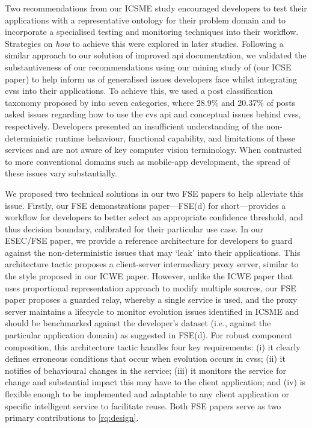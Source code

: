 Two recommendations from our ICSME study encouraged developers to test their applications with a representative ontology for their problem domain and to incorporate a specialised testing and monitoring techniques into their workflow. Strategies on \textit{how} to achieve this were explored in later studies.  Following a similar approach to our solution of improved \gls{api} documentation, we validated the substantiveness of our recommendations using our mining study of  (our ICSE paper) to help inform us of generalised issues developers face whilst integrating \glspl{cvs} into their applications. To achieve this, we used a  post classification taxonomy proposed by \citet{Beyer:2018fm} into seven categories, where 28.9\% and 20.37\% of posts asked issues regarding how to use the \gls{cvs} \gls{api} and conceptual issues behind \glspl{cvs}, respectively. Developers presented an insufficient understanding of the non-deterministic runtime behaviour, functional capability, and limitations of these services and are not aware of key computer vision terminology. When contrasted to more conventional domains such as mobile-app development, the spread of these issues vary substantially.

We proposed two technical solutions in our two FSE papers to help alleviate this issue. Firstly, our FSE demonstrations paper---FSE(d) for short---provides a workflow for developers to better select an appropriate confidence threshold, and thus decision boundary, calibrated for their particular use case. In our ESEC/FSE paper, we provide a reference architecture for developers to guard against the non-deterministic issues that may `leak' into their applications. This architecture tactic proposes a client-server intermediary proxy server, similar to the style proposed in our ICWE paper. However, unlike the ICWE paper that uses proportional representation approach to modify multiple sources, our FSE paper proposes a guarded relay, whereby a single service is used, and the proxy server maintains a lifecycle to monitor evolution issues identified in ICSME and should be benchmarked against the developer's dataset (i.e., against the particular application domain) as suggested in FSE(d). For robust component composition, this architecture tactic handles four key requirements: (i) it clearly defines erroneous conditions that occur when evolution occurs in \glspl{cvs}; (ii) it notifies of behavioural changes in the service; (iii) it monitors the service for change and substantial impact this may have to the client application; and (iv) is flexible enough to be implemented and adaptable to any client application or specific intelligent service to facilitate reuse. Both FSE papers serve as two primary contributions to \ref{rq:design}.

